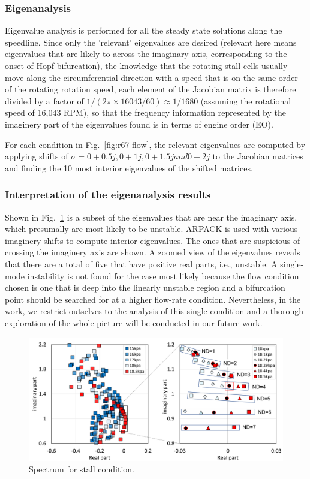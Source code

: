 \documentclass[journal,final]{new-aiaa}
\begin{document}
\subsubsection{Eigenanalysis}
Eigenvalue analysis is performed for all the steady state solutions along the
speedline. Since only the 'relevant' eigenvalues are desired (relevant here
means eigenvalues that are likely to across the imaginary axis, corresponding
to the onset of Hopf-bifurcation), the knowledge that the rotating stall cells
usually move along the circumferential direction with a speed that is on the
same order of the rotating rotation speed, each element of the Jacobian
matrix is therefore divided by a factor of $1/(2\pi \times 16043 / 60)\approx 1/1680$ (assuming
the rotational speed of 16,043 RPM),
so that the frequency information represented by the imaginery part of the
eigenvalues found is in terms of engine order (EO).

For each condition in Fig.~\ref{fig:r67-flow}, the relevant eigenvalues are computed
by applying shifts of $\sigma= 0+0.5j, 0+1j, 0+1.5j and 0+2j$ to the Jacobian matrices and
finding the 10 most interior eigenvalues of the shifted matrices.


\subsubsection{Interpretation of the eigenanalysis results}

Shown in Fig.~\ref{fig:r67-eigenvalue-18kpa} is a subset of the eigenvalues
that are near the imaginary axis, which presumally are most likely to
be unstable. ARPACK is used with various imaginery shifts to compute
interior eigenvalues. The ones that are suspicious of crossing the
imaginery axis are shown. A zoomed view of the eigenvalues reveals
that there are a total of five that have positive real parts, i.e., unstable.
A single-mode instability is not found for the case most likely because
the flow condition chosen is one that is deep into the linearly unstable
region and a bifurcation point should be searched for at a higher flow-rate
condition. Nevertheless, in the work, we restrict outselves to the analysis
of this single condition and a thorough exploration of the whole picture will
be conducted in our future work.


\begin{figure}[htb]
	\centering   
	\includegraphics[width=\textwidth]{eigen-annular-cascade.png}	
	\caption{Spectrum for stall condition.}
	\label{fig:r67-eigenvalue-18kpa}
\end{figure}
\end{document}
